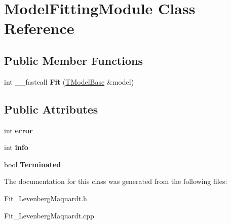 \hypertarget{class_model_fitting_module}{\section{Model\+Fitting\+Module Class Reference}
\label{class_model_fitting_module}
}
\subsection*{Public Member Functions}
\begin{DoxyCompactItemize}
\item 
\hypertarget{class_model_fitting_module_ad56e2fcb33a8eceecdd624d5dcc7707e}{int \+\_\+\+\_\+fastcall {\bfseries Fit} (\hyperlink{class_t_model_base}{T\+Model\+Base} \&model)}\label{class_model_fitting_module_ad56e2fcb33a8eceecdd624d5dcc7707e}

\end{DoxyCompactItemize}
\subsection*{Public Attributes}
\begin{DoxyCompactItemize}
\item 
\hypertarget{class_model_fitting_module_a2098daaf20fb71506cc48b05756368fc}{int {\bfseries error}}\label{class_model_fitting_module_a2098daaf20fb71506cc48b05756368fc}

\item 
\hypertarget{class_model_fitting_module_a0d46075f9a379565a611dd039ca1814b}{int {\bfseries info}}\label{class_model_fitting_module_a0d46075f9a379565a611dd039ca1814b}

\item 
\hypertarget{class_model_fitting_module_a4f5bd2b9fa4cbe079ecb60d69e8aab79}{bool {\bfseries Terminated}}\label{class_model_fitting_module_a4f5bd2b9fa4cbe079ecb60d69e8aab79}

\end{DoxyCompactItemize}


The documentation for this class was generated from the following files\+:\begin{DoxyCompactItemize}
\item 
Fit\+\_\+\+Levenberg\+Maquardt.\+h\item 
Fit\+\_\+\+Levenberg\+Maquardt.\+cpp\end{DoxyCompactItemize}
